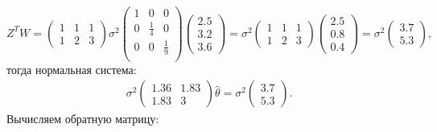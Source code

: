 \documentclass[a4paper,12pt]{article}
\begin{document}
\begin{enumerate}
          \[
              Z^T W
              = \begin{pmatrix}
                  1 & 1 & 1 \\
                  1 & 2 & 3
              \end{pmatrix}
              \sigma^2
              \begin{pmatrix}
                  1 & 0           & 0           \\
                  0 & \frac{1}{4} & 0           \\
                  0 & 0           & \frac{1}{9} \\
              \end{pmatrix}
              \begin{pmatrix}
                  2.5 \\
                  3.2 \\
                  3.6
              \end{pmatrix}
              = \sigma^2
              \begin{pmatrix}
                  1 & 1 & 1 \\
                  1 & 2 & 3
              \end{pmatrix}
              \begin{pmatrix}
                  2.5 \\
                  0.8 \\
                  0.4
              \end{pmatrix}
              = \sigma^2
              \begin{pmatrix}
                  3.7 \\
                  5.3
              \end{pmatrix} ,
          \]
          тогда нормальная система:
          \begin{gather*}
              \sigma^2
              \begin{pmatrix}
                  1.36 & 1.83 \\
                  1.83 & 3
              \end{pmatrix}
              \widehat{\theta}
              =
              \sigma^2
              \begin{pmatrix}
                  3.7 \\
                  5.3
              \end{pmatrix} .
          \end{gather*}
          Вычисляем обратную матрицу:
          \begin{gather*}

\end{gather*}
\end{enumerate}
\end{document}
